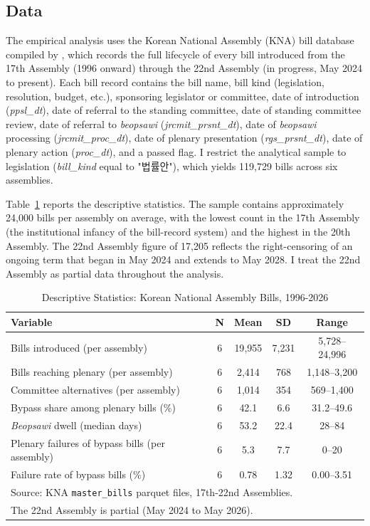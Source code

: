 \documentclass[11pt]{article}
\begin{document}
\subsection{Data}

The empirical analysis uses the Korean National Assembly (KNA) bill database compiled by \citet{kna2026}, which records the full lifecycle of every bill introduced from the 17th Assembly (1996 onward) through the 22nd Assembly (in progress, May 2024 to present). Each bill record contains the bill name, bill kind (legislation, resolution, budget, etc.), sponsoring legislator or committee, date of introduction (\textit{ppsl\_dt}), date of referral to the standing committee, date of standing committee review, date of referral to \textit{beopsawi} (\textit{jrcmit\_prsnt\_dt}), date of \textit{beopsawi} processing (\textit{jrcmit\_proc\_dt}), date of plenary presentation (\textit{rgs\_prsnt\_dt}), date of plenary action (\textit{proc\_dt}), and a passed flag. I restrict the analytical sample to legislation (\textit{bill\_kind} equal to "법률안"), which yields 119{,}729 bills across six assemblies.

Table~\ref{tab:desc} reports the descriptive statistics. The sample contains approximately 24{,}000 bills per assembly on average, with the lowest count in the 17th Assembly (the institutional infancy of the bill-record system) and the highest in the 20th Assembly. The 22nd Assembly figure of 17{,}205 reflects the right-censoring of an ongoing term that began in May 2024 and extends to May 2028. I treat the 22nd Assembly as partial data throughout the analysis.

\begin{table}[H]
\centering
\caption{Descriptive Statistics: Korean National Assembly Bills, 1996-2026}
\label{tab:desc}
\begin{tabular}{lcccc}
\toprule
Variable & N & Mean & SD & Range \\
\midrule
Bills introduced (per assembly) & 6 & 19{,}955 & 7{,}231 & 5{,}728--24{,}996 \\
Bills reaching plenary (per assembly) & 6 & 2{,}414 & 768 & 1{,}148--3{,}200 \\
Committee alternatives (per assembly) & 6 & 1{,}014 & 354 & 569--1{,}400 \\
Bypass share among plenary bills (\%) & 6 & 42.1 & 6.6 & 31.2--49.6 \\
\textit{Beopsawi} dwell (median days) & 6 & 53.2 & 22.4 & 28--84 \\
Plenary failures of bypass bills (per assembly) & 6 & 5.3 & 7.7 & 0--20 \\
Failure rate of bypass bills (\%) & 6 & 0.78 & 1.32 & 0.00--3.51 \\
\bottomrule
\multicolumn{5}{l}{\footnotesize Source: KNA \texttt{master\_bills} parquet files, 17th-22nd Assemblies.} \\
\multicolumn{5}{l}{\footnotesize The 22nd Assembly is partial (May 2024 to May 2026).} \\
\end{tabular}
\end{table}
\end{document}
